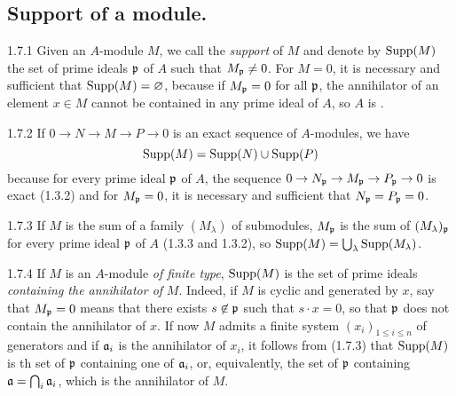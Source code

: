 \documentclass[../main.tex]{subfiles}
\begin{document}
\subsection{Support of a module.}

\begin{cx}{1.7.1}
Given an $A$-module $M$, we call the \emph{support} of $M$ and denote by $\operatorname*{Supp}(M)$
the set of prime ideals $\mathfrak{p}$ of $A$ such that $M_\mathfrak{p}\neq 0$. For $M=0$, it
is necessary and sufficient that $\operatorname*{Supp}(M)=\varnothing$, because if $M_\mathfrak{p}=0$ for all
$\mathfrak{p}$, the annihilator of an element $x\in M$ cannot be contained in any prime
ideal of $A$, so $A$ is .
\end{cx}

\begin{cx}{1.7.2}
If $0\to N\to M\to P\to 0$ is an exact sequence of $A$-modules, we have
\[
  \operatorname*{Supp}(M)=\operatorname*{Supp}(N)\cup\operatorname*{Supp}(P)
\]
because for every prime ideal $\mathfrak{p}$ of $A$, the sequence
${0\to N_\mathfrak{p}\to M_\mathfrak{p}\to P_\mathfrak{p}\to 0}$ is exact (1.3.2) and for
$M_\mathfrak{p}=0$, it is necessary and sufficient that $N_\mathfrak{p}=P_\mathfrak{p}=0$.
\end{cx}

\begin{cx}{1.7.3}
If $M$ is the sum of a family $(M_\lambda)$ of submodules, $M_\mathfrak{p}$ is the sum
of $(M_\lambda)_\mathfrak{p}$ for every prime ideal $\mathfrak{p}$ of $A$ (1.3.3 and 1.3.2),
so $\operatorname*{Supp}(M)=\bigcup_\lambda\operatorname*{Supp}(M_\lambda)$.
\end{cx}

\begin{cx}{1.7.4}
If $M$ is an $A$-module \emph{of finite type}, $\operatorname*{Supp}(M)$ is the set of prime
ideals \emph{containing the annihilator of} $M$. Indeed, if $M$ is cyclic and
generated by $x$, say that $M_\mathfrak{p}=0$ means that there exists $s\not\in\mathfrak{p}$
such that $s\cdot x=0$, so that $\mathfrak{p}$ does not contain the annihilator of $x$.
If now $M$ admits a finite system $(x_i)_{1\leq i\leq n}$ of generators and if
$\mathfrak{a}_i$ is the annihilator of $x_i$, it follows from (1.7.3) that $\operatorname*{Supp}(M)$
is th set of $\mathfrak{p}$ containing one of $\mathfrak{a}_i$, or, equivalently, the
set of $\mathfrak{p}$ containing $\mathfrak{a}=\bigcap_i\mathfrak{a}_i$, which is the annihilator
of $M$.
\end{cx}
\end{document}
